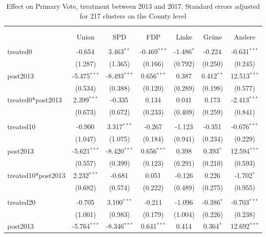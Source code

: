 \documentclass[12pt]{article}
\begin{document}
 
\begin{table}[!htbp] \centering
  \caption{Effect on Primary Vote, treatment between 2013 and 2017. Standard errors adjusted for 217 clusters on the County level}
\begin{tabular}{@{\extracolsep{5pt}}lcccccc}
\\[-1.8ex]\hline
\hline \\[-1.8ex]
\\[-1.8ex] & \multicolumn{1}{c}{Union} & \multicolumn{1}{c}{SPD} & \multicolumn{1}{c}{FDP} & \multicolumn{1}{c}{Linke} & \multicolumn{1}{c}{Grüne} & \multicolumn{1}{c}{Andere}  \\
\hline \\[-1.8ex]
 treated0 & -0.654$^{}$ & 3.463$^{**}$ & -0.469$^{***}$ & -1.486$^{*}$ & -0.224$^{}$ & -0.631$^{***}$ \\
  & (1.287) & (1.365) & (0.166) & (0.792) & (0.250) & (0.245) \\
 post2013 & -5.475$^{***}$ & -8.493$^{***}$ & 0.656$^{***}$ & 0.387$^{}$ & 0.412$^{**}$ & 12.513$^{***}$ \\
  & (0.534) & (0.388) & (0.120) & (0.289) & (0.198) & (0.577) \\
 treated0*post2013 & 2.399$^{***}$ & -0.335$^{}$ & 0.134$^{}$ & 0.041$^{}$ & 0.173$^{}$ & -2.413$^{***}$ \\
  & (0.673) & (0.672) & (0.233) & (0.409) & (0.259) & (0.841) \\
\hline \\[-1.8ex]
 treated10 & -0.900$^{}$ & 3.317$^{***}$ & -0.267$^{}$ & -1.123$^{}$ & -0.351$^{}$ & -0.676$^{***}$ \\
  & (1.047) & (1.075) & (0.184) & (0.941) & (0.234) & (0.229) \\
 post2013 & -5.621$^{***}$ & -8.420$^{***}$ & 0.656$^{***}$ & 0.398$^{}$ & 0.393$^{*}$ & 12.594$^{***}$ \\
  & (0.557) & (0.399) & (0.123) & (0.291) & (0.210) & (0.593) \\
 treated10*post2013 & 2.232$^{***}$ & -0.681$^{}$ & 0.051$^{}$ & -0.126$^{}$ & 0.226$^{}$ & -1.702$^{*}$ \\
  & (0.682) & (0.574) & (0.222) & (0.489) & (0.275) & (0.955) \\
\hline \\[-1.8ex]
 treated20 & -0.705$^{}$ & 3.100$^{***}$ & -0.211$^{}$ & -1.096$^{}$ & -0.386$^{*}$ & -0.703$^{***}$ \\
  & (1.001) & (0.983) & (0.179) & (1.004) & (0.226) & (0.238) \\
 post2013 & -5.764$^{***}$ & -8.346$^{***}$ & 0.641$^{***}$ & 0.414$^{}$ & 0.364$^{*}$ & 12.692$^{***}$ \\

\end{tabular}
\end{table}
\end{document}
